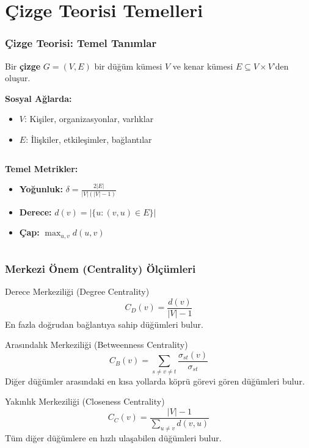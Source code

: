 \documentclass[aspectratio=169]{beamer}
\begin{document}
\section{Çizge Teorisi Temelleri}

\begin{frame}
\frametitle{Çizge Teorisi: Temel Tanımlar}
\begin{definition}
Bir \textbf{çizge} $G = (V, E)$ bir düğüm kümesi $V$ ve kenar kümesi $E \subseteq V \times V$'den oluşur.
\end{definition}

\vspace{0.3cm}
\textbf{Sosyal Ağlarda:}
\begin{itemize}
    \item $V$: Kişiler, organizasyonlar, varlıklar
    \item $E$: İlişkiler, etkileşimler, bağlantılar
\end{itemize}

\vspace{0.3cm}
\begin{columns}
\begin{column}{0.5\textwidth}
\textbf{Temel Metrikler:}
\begin{itemize}
    \item \textbf{Yoğunluk:} $\delta = \frac{2|E|}{|V|(|V|-1)}$
    \item \textbf{Derece:} $d(v) = |\{u : (v,u) \in E\}|$
    \item \textbf{Çap:} $\max_{u,v} d(u,v)$
\end{itemize}
\end{column}
\begin{column}{0.5\textwidth}
\end{column}
\end{columns}
\end{frame}

\begin{frame}
\frametitle{Merkezi Önem (Centrality) Ölçümleri}
\begin{block}{Derece Merkeziliği (Degree Centrality)}
$$C_D(v) = \frac{d(v)}{|V|-1}$$
En fazla doğrudan bağlantıya sahip düğümleri bulur.
\end{block}

\begin{block}{Arasındalık Merkeziliği (Betweenness Centrality)}
$$C_B(v) = \sum_{s \neq v \neq t} \frac{\sigma_{st}(v)}{\sigma_{st}}$$
Diğer düğümler arasındaki en kısa yollarda köprü görevi gören düğümleri bulur.
\end{block}

\begin{block}{Yakınlık Merkeziliği (Closeness Centrality)}
$$C_C(v) = \frac{|V|-1}{\sum_{u \neq v} d(v,u)}$$
Tüm diğer düğümlere en hızlı ulaşabilen düğümleri bulur.
\end{block}
\end{frame}
\end{document}
